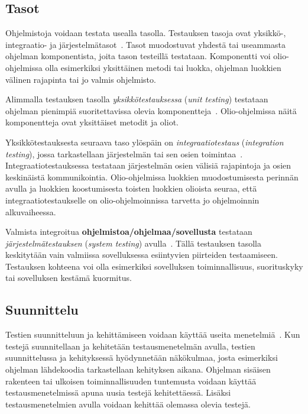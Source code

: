 \documentclass[finnish, grading]{tktltiki2}
\theoremstyle{definition}
\theoremstyle{remark}
\begin{document}
\subsection{Tasot}

Ohjelmistoja voidaan testata usealla tasolla. Testauksen tasoja ovat yksikkö-, integraatio- ja järjestelmätasot~\cite[s. 45]{Binder:1999}. Tasot muodostuvat yhdestä tai useammasta ohjelman komponentista, joita tason testeillä testataan. Komponentti voi olio-ohjelmissa olla esimerkiksi yksittäinen metodi tai luokka, ohjelman luokkien välinen rajapinta tai jo valmis ohjelmisto.

Alimmalla testauksen tasolla \textit{yksikkötestauksessa} (\textit{unit testing}) testataan ohjelman pienimpiä suoritettavissa olevia komponentteja~\cite[s. 45]{Binder:1999}. Olio-ohjelmissa näitä komponentteja ovat yksittäiset metodit ja oliot.

Yksikkötestauksesta seuraava taso ylöspäin on \textit{integraatiotestaus} (\textit{integration testing}), jossa tarkastellaan järjestelmän tai sen osien toimintaa~\cite[s. 45]{Binder:1999}. Integraatiotestauksessa testataan järjestelmän osien välisiä rajapintoja ja osien keskinäistä kommunikointia. Olio-ohjelmissa luokkien muodostumisesta perinnän avulla ja luokkien koostumisesta toisten luokkien olioista seuraa, että integraatiotestaukselle on olio-ohjelmoinnissa tarvetta jo ohjelmoinnin alkuvaiheessa.

Valmista integroitua \textbf{ohjelmistoa/ohjelmaa/sovellusta} testataan \textit{järjestelmätestauksen} (\textit{system testing}) avulla~\cite[s. 45]{Binder:1999}. Tällä testauksen tasolla keskitytään vain valmiissa sovelluksessa esiintyvien piirteiden testaamiseen. Testauksen kohteena voi olla esimerkiksi sovelluksen toiminnallisuus, suorituskyky tai sovelluksen kestämä kuormitus.

\subsection{Suunnittelu}

Testien suunnitteluun ja kehittämiseen voidaan käyttää useita menetelmiä~\cite[s. 51]{Binder:1999}. Kun testejä suunnitellaan ja kehitetään testausmenetelmän avulla, testien suunnittelussa ja kehityksessä hyödynnetään näkökulmaa, josta esimerkiksi ohjelman lähdekoodia tarkastellaan kehityksen aikana. Ohjelman sisäisen rakenteen tai ulkoisen toiminnallisuuden tuntemusta voidaan käyttää testausmenetelmissä apuna uusia testejä kehitettäessä. Lisäksi testausmenetelmien avulla voidaan kehittää olemassa olevia testejä.
\end{document}
